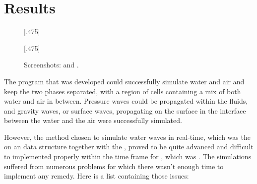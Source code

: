 \chapter{Results}

\begin{figure}
    \centering
    \subcaptionbox{\label{fig:initialconditionscreenshoot}}[.475\textwidth]{
        \begin{tikzpicture}[x={(.35\textwidth,0)},y={(0,.35\textwidth)}]
        
        \end{tikzpicture}
    }
    \subcaptionbox{\label{fig:splashscreenshoot}}[.475\textwidth]{
        \begin{tikzpicture}[x={(.35\textwidth,0)},y={(0,.35\textwidth)}]
        
        \end{tikzpicture}
    }
    \caption{Screenshots:  and .}
    \label{fig:screenshots}
\end{figure}


The program that was developed could successfully simulate water and air and keep the two phases separated, with a region of cells containing a mix of both water and air in between. Pressure waves could be propagated within the fluids, and gravity waves, or surface waves, propagating on the surface in the interface between the water and the air were successfully simulated.


However, the method chosen to simulate water waves in real-time, which was the \FVM on an \octree data structure together with the \VOF, proved to be quite advanced and difficult to implemented properly within the time frame for \thismasterthesiswork, which was \masterthesisworktime. The simulations suffered from numerous problems for which there wasn't enough time to implement any remedy. Here is a list containing those issues:


